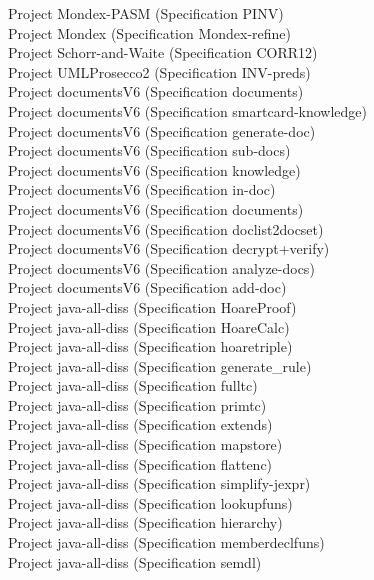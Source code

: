 \documentclass[a4paper]{article}
\begin{document}
\begin{itemize}
Project Mondex-PASM (Specification PINV) \\
Project Mondex (Specification Mondex-refine) \\
Project Schorr-and-Waite (Specification CORR12) \\
Project UMLProsecco2 (Specification INV-preds) \\
Project documentsV6 (Specification documents) \\
Project documentsV6 (Specification smartcard-knowledge) \\
Project documentsV6 (Specification generate-doc) \\
Project documentsV6 (Specification sub-docs) \\
Project documentsV6 (Specification knowledge) \\
Project documentsV6 (Specification in-doc) \\
Project documentsV6 (Specification documents) \\
Project documentsV6 (Specification doclist2docset) \\
Project documentsV6 (Specification decrypt+verify) \\
Project documentsV6 (Specification analyze-docs) \\
Project documentsV6 (Specification add-doc) \\
Project java-all-diss (Specification HoareProof) \\
Project java-all-diss (Specification HoareCalc) \\
Project java-all-diss (Specification hoaretriple) \\
Project java-all-diss (Specification generate\_rule) \\
Project java-all-diss (Specification fulltc) \\
Project java-all-diss (Specification primtc) \\
Project java-all-diss (Specification extends) \\
Project java-all-diss (Specification mapstore) \\
Project java-all-diss (Specification flattenc) \\
Project java-all-diss (Specification simplify-jexpr) \\
Project java-all-diss (Specification lookupfuns) \\
Project java-all-diss (Specification hierarchy) \\
Project java-all-diss (Specification memberdeclfuns) \\
Project java-all-diss (Specification semdl) \\

\end{itemize}
\end{document}

